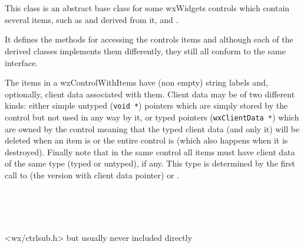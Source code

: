 
\section{}\label{wxcontrolwithitems}

This class is an abstract base class for some wxWidgets controls which contain
several items, such as  and 
 derived from it, 
 and .

It defines the methods for accessing the controls items and although each of
the derived classes implements them differently, they still all conform to the
same interface.

The items in a wxControlWithItems have (non empty) string labels and,
optionally, client data associated with them. Client data may be of two
different kinds: either simple untyped ({\tt void *}) pointers which are simply
stored by the control but not used in any way by it, or typed pointers
({\tt wxClientData *}) which are owned by the control meaning that the typed
client data (and only it) will be deleted when an item is 
 or the entire control is 
 (which also happens when it is
destroyed). Finally note that in the same control all items must have client
data of the same type (typed or untyped), if any. This type is determined by
the first call to  (the version with
client data pointer) or .


\\
\\
\\


<wx/ctrlsub.h> but usually never included directly

